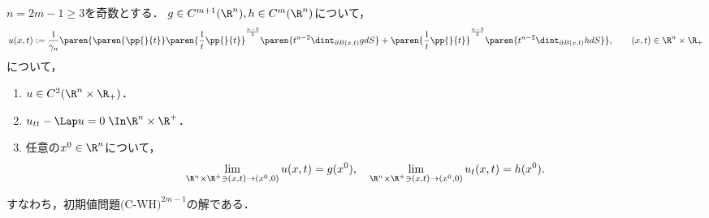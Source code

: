 \documentclass[uplatex,dvipdfmx]{jsreport}
\begin{document}
\begin{theorem}\label{thm-C-WE-in-odd-dimension}
    $n=2m-1\ge3$を奇数とする．
    $g\in C^{m+1}(\R^n),h\in C^m(\R^n)$について，
    \[u(x,t):=\frac{1}{\gamma_n}\paren{\paren{\pp{}{t}}\paren{\frac{1}{t}\pp{}{t}}^{\frac{n-3}{2}}\paren{t^{n-2}\dint_{\partial B(x,t)}gdS}+\paren{\frac{1}{t}\pp{}{t}}^{\frac{n-3}{2}}\paren{t^{n-2}\dint_{\partial B(x,t)}hdS}},\qquad(x,t)\in\R^n\times\R_+\]
    について，
    \begin{enumerate}
        \item $u\in C^2(\R^n\times\R_+)$．
        \item $u_{tt}-\Lap u=0\;\In\R^n\times\R^+$．
        \item 任意の$x^0\in\R^n$について，
        \[\lim_{\R^n\times\R^+\ni(x,t)\to(x^0,0)}u(x,t)=g(x^0),\quad\lim_{\R^n\times\R^+\ni(x,t)\to(x^0,0)}u_t(x,t)=h(x^0).\]
    \end{enumerate}
    すなわち，初期値問題$\text{(C-WH)}^{2m-1}$の解である．
\end{theorem}
\end{document}

